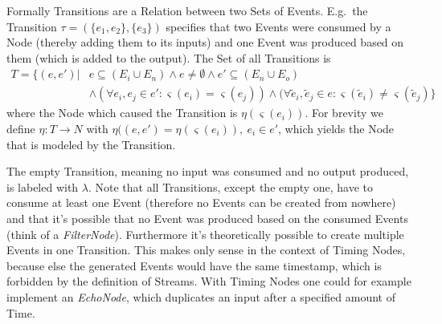 Formally Transitions are a Relation between two Sets of Events.
E.g.\ the Transition \(\tau = (\{e_1,e_2\}, \{e_3\})\) specifies that two Events were consumed by a Node (thereby adding them to its inputs) and one Event was produced based on them (which is added to the output).
The Set of all Transitions is
\begin{align*}
  T = \{(e, e') | &e \subseteq (E_i \cup E_n) \land e \neq \emptyset \land e' \subseteq (E_n \cup E_o)\\
                  &\land (\forall e_i, e_j \in e': \varsigma(e_i) = \varsigma(e_j)) \land (\forall \widetilde{e}_i, \widetilde{e}_j \in e: \varsigma(\widetilde{e}_i) \neq \varsigma(\widetilde{e}_j)\}
\end{align*}
where the Node which caused the Transition is \(\eta(\varsigma(e_i))\).
For brevity we define \(\eta : T \rightarrow N\) with \(\eta((e, e') = \eta(\varsigma(e_i)),\ e_i \in e'\), which yields the Node that is modeled by the Transition.

The empty Transition, meaning no input was consumed and no output produced, is labeled with \(\lambda\).
Note that all Transitions, except the empty one, have to consume at least one Event (therefore no Events can be created from nowhere) and that it's possible that no Event was produced based on the consumed Events (think of a \emph{FilterNode}).
Furthermore it's theoretically possible to create multiple Events in one Transition.
This makes only sense in the context of Timing Nodes, because else the generated Events would have the same timestamp, which is forbidden by the definition of Streams.
With Timing Nodes one could for example implement an \emph{EchoNode}, which duplicates an input after a specified amount of Time.

